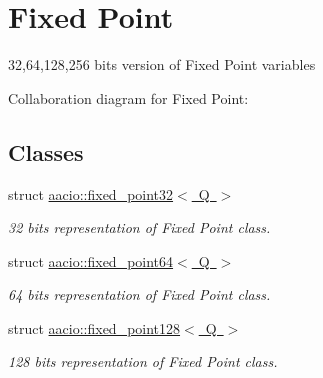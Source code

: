 \hypertarget{group__fixedpoint}{}\section{Fixed Point}
\label{group__fixedpoint}


32,64,128,256 bits version of Fixed Point variables  


Collaboration diagram for Fixed Point\+:
\subsection*{Classes}
\begin{DoxyCompactItemize}
\item 
struct \mbox{\hyperlink{structaacio_1_1fixed__point32}{aacio\+::fixed\+\_\+point32$<$ Q $>$}}
\begin{DoxyCompactList}\small\item\em 32 bits representation of Fixed Point class. \end{DoxyCompactList}\item 
struct \mbox{\hyperlink{structaacio_1_1fixed__point64}{aacio\+::fixed\+\_\+point64$<$ Q $>$}}
\begin{DoxyCompactList}\small\item\em 64 bits representation of Fixed Point class. \end{DoxyCompactList}\item 
struct \mbox{\hyperlink{structaacio_1_1fixed__point128}{aacio\+::fixed\+\_\+point128$<$ Q $>$}}
\begin{DoxyCompactList}\small\item\em 128 bits representation of Fixed Point class. \end{DoxyCompactList}\end{DoxyCompactItemize}
